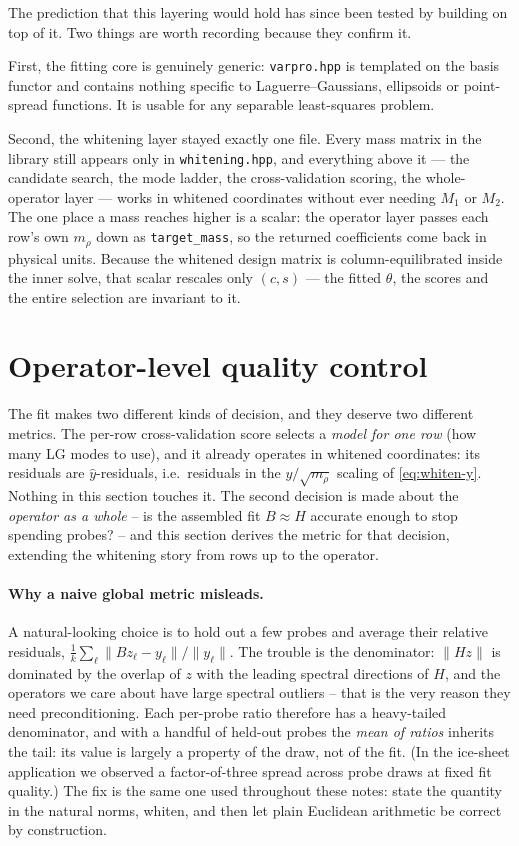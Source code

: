 \documentclass[11pt]{article}
\newcommand{\Mone}{M_1}
\newcommand{\Mtwo}{M_2}
\newcommand{\what}[1]{\widehat{#1}}
\begin{document}
The prediction that this layering would hold has since been tested by building
on top of it. Two things are worth recording because they confirm it.

First, the fitting core is genuinely generic: \texttt{varpro.hpp} is templated
on the basis functor and contains nothing specific to Laguerre--Gaussians,
ellipsoids or point-spread functions. It is usable for any separable
least-squares problem.

Second, the whitening layer stayed exactly one file. Every mass matrix in the
library still appears only in \texttt{whitening.hpp}, and everything above it
--- the candidate search, the mode ladder, the cross-validation scoring, the
whole-operator layer --- works in whitened coordinates without ever needing
$\Mone$ or $\Mtwo$. The one place a mass reaches higher is a scalar: the
operator layer passes each row's own $m_\rho$ down as \texttt{target\_mass}, so
the returned coefficients come back in physical units. Because the whitened
design matrix is column-equilibrated inside the inner solve, that scalar
rescales only $(c, s)$ --- the fitted $\theta$, the scores and the entire
selection are invariant to it.

\section{Operator-level quality control}
\label{sec:operator-qc}

The fit makes two different kinds of decision, and they deserve two different
metrics. The per-row cross-validation score selects a \emph{model for one row}
(how many LG modes to use), and it already operates in whitened coordinates:
its residuals are $\what y$-residuals, i.e.\ residuals in the $y/\sqrt{m_\rho}$
scaling of \eqref{eq:whiten-y}. Nothing in this section touches it. The second
decision is made about the \emph{operator as a whole} -- is the assembled fit
$B \approx H$ accurate enough to stop spending probes? -- and this section
derives the metric for that decision, extending the whitening story from rows
up to the operator.

\paragraph{Why a naive global metric misleads.} A natural-looking choice is to
hold out a few probes and average their relative residuals,
$\tfrac1k\sum_\ell \|Bz_\ell - y_\ell\| / \|y_\ell\|$. The trouble is the
denominator: $\|Hz\|$ is dominated by the overlap of $z$ with the leading
spectral directions of $H$, and the operators we care about have large spectral
outliers -- that is the very reason they need preconditioning. Each per-probe
ratio therefore has a heavy-tailed denominator, and with a handful of held-out
probes the \emph{mean of ratios} inherits the tail: its value is largely a
property of the draw, not of the fit. (In the ice-sheet application we observed
a factor-of-three spread across probe draws at fixed fit quality.) The fix is
the same one used throughout these notes: state the quantity in the natural
norms, whiten, and then let plain Euclidean arithmetic be correct by
construction.
\end{document}
